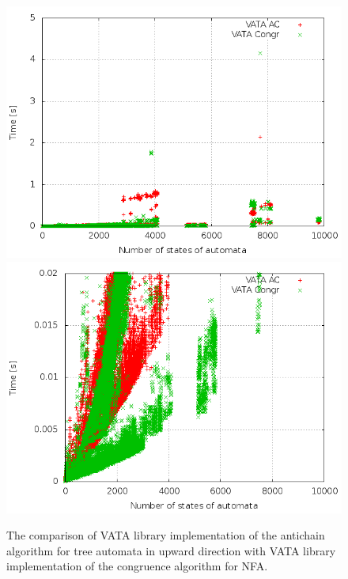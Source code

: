 \begin{figure}[bt]
\begin{center}
\includegraphics[scale=0.3]{fig/plot_ac_zprava.png}
\includegraphics[scale=0.3]{fig/plot_ac_step_zprava.png}
\caption{The comparison of VATA library implementation of the antichain algorithm for tree automata in upward direction
    with VATA library implementation of the congruence algorithm for NFA.}
\label{fig:figPlotAc}
\end{center}
\end{figure}

